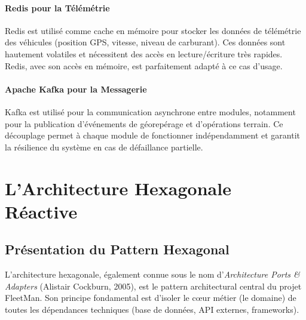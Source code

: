 \documentclass[12pt,a4paper]{report}
\begin{document}
\subsubsection{Redis pour la Télémétrie}

Redis est utilisé comme cache en mémoire pour stocker les données de télémétrie des véhicules (position GPS, vitesse, niveau de carburant). Ces données sont hautement volatiles et nécessitent des accès en lecture/écriture très rapides. Redis, avec son accès en mémoire, est parfaitement adapté à ce cas d'usage.

\subsubsection{Apache Kafka pour la Messagerie}

Kafka est utilisé pour la communication asynchrone entre modules, notamment pour la publication d'événements de géorepérage et d'opérations terrain. Ce découplage permet à chaque module de fonctionner indépendamment et garantit la résilience du système en cas de défaillance partielle.

\chapter{L'Architecture Hexagonale Réactive}

\section{Présentation du Pattern Hexagonal}

L'architecture hexagonale, également connue sous le nom d'\textit{Architecture Ports \& Adapters} (Alistair Cockburn, 2005), est le pattern architectural central du projet FleetMan. Son principe fondamental est d'isoler le cœur métier (le domaine) de toutes les dépendances techniques (base de données, API externes, frameworks).
\end{document}
